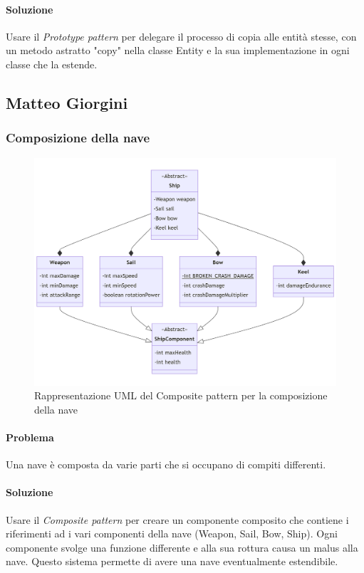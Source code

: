 \documentclass[a4paper,12pt]{report}
\begin{document}
\paragraph{Soluzione} Usare il \textit{Prototype pattern} per delegare il processo di copia alle entità stesse, con un metodo astratto "copy" nella classe Entity e la sua implementazione in ogni classe che la estende.

\subsection*{Matteo Giorgini}
\subsubsection*{Composizione della nave}

\begin{figure}[H]
	\centering{}
	\includegraphics[width=\textwidth]{img/Ship.png}
	\caption{Rappresentazione UML del Composite pattern per la composizione della nave}
	\label{img:Ship}
\end{figure}

\paragraph{Problema} Una nave è composta da varie parti che si occupano di compiti differenti.
\paragraph{Soluzione} Usare il \textit{Composite pattern} per creare un componente composito che contiene i riferimenti ad i vari componenti della nave (Weapon, Sail, Bow, Ship).
%
Ogni componente svolge una funzione differente e alla sua rottura causa un malus alla nave.
%
Questo sistema permette di avere una nave eventualmente estendibile.
\end{document}
